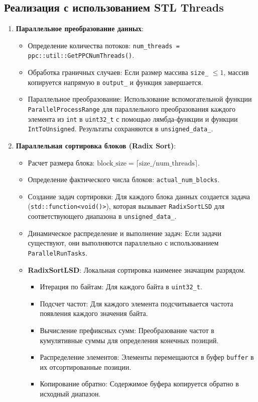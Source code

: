 \documentclass[12pt,a4paper]{extarticle}
\begin{document}
	\subsection{Реализация с использованием STL Threads}
\begin{enumerate}

    \item \textbf{Параллельное преобразование данных}:
    \begin{itemize}
        \item Определение количества потоков: \texttt{num\_threads = ppc::util::GetPPCNumThreads()}.
        \item Обработка граничных случаев: Если размер массива \texttt{size\_} $\le 1$, массив копируется напрямую в \texttt{output\_} и функция завершается.
        \item Параллельное преобразование: Использование вспомогательной функции \texttt{ParallelProcessRange} для параллельного преобразования каждого элемента из \texttt{int} в \texttt{uint32\_t} с помощью лямбда-функции и функции \texttt{IntToUnsigned}. Результаты сохраняются в \texttt{unsigned\_data\_}.
    \end{itemize}
    
    \item \textbf{Параллельная сортировка блоков (Radix Sort)}:
    \begin{itemize}
        \item Расчет размера блока: $\mathrm{block\_size} = \lceil \mathrm{size\_} / \mathrm{num\_threads} \rceil$.
        \item Определение фактического числа блоков: \texttt{actual\_num\_blocks}.
        \item Создание задач сортировки: Для каждого блока данных создается задача (\texttt{std::function<void()>}), которая вызывает \texttt{RadixSortLSD} для соответствующего диапазона в \texttt{unsigned\_data\_}.
        \item Динамическое распределение и выполнение задач: Если задачи существуют, они выполняются параллельно с использованием \texttt{ParallelRunTasks}.

        \item \textbf{RadixSortLSD}: Локальная сортировка наименее значащим разрядом.
        \begin{itemize}
            \item Итерация по байтам: Для каждого байта в \texttt{uint32\_t}.
            \item Подсчет частот: Для каждого элемента подсчитывается частота появления каждого значения байта.
            \item Вычисление префиксных сумм: Преобразование частот в кумулятивные суммы для определения конечных позиций.
            \item Распределение элементов: Элементы перемещаются в буфер \texttt{buffer} в их отсортированные позиции.
            \item Копирование обратно: Содержимое буфера копируется обратно в исходный диапазон.
        \end{itemize}
    \end{itemize}
    

\end{enumerate}
\end{document}
